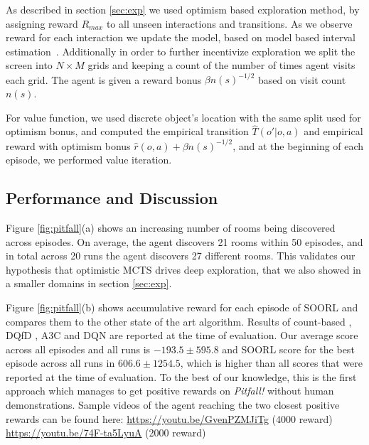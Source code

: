 As described in section \ref{sec:exp} we used optimism based exploration method, by assigning reward $R_{max}$ to all unseen interactions and transitions. As we observe reward for each interaction we update the model, based on model based interval estimation~\citep{strehl2008analysis}. Additionally in order to further incentivize exploration we split the screen into $N \times  M$ grids and keeping a count of the number of times agent visits each grid. The agent is given a reward bonus $\beta n(s)^{-1/2}$ based on visit count $n(s)$.

For value function, we used discrete object's location with the same split used for optimism bonus, and computed the empirical transition $\hat{T}(o'|o,a)$ and empirical reward with optimism bonus $\hat{r}(o,a) + \beta n(s)^{-1/2}$, and at the beginning of each episode, we performed value iteration.

\subsection{Performance and Discussion}



Figure \ref{fig:pitfall}(a) shows an increasing number of rooms being discovered across episodes. On average, the agent discovers 21 rooms within 50 episodes, and in total across 20 runs the agent discovers 27 different rooms. This validates our hypothesis that optimistic MCTS drives deep exploration, that we also showed in a smaller domains in section \ref{sec:exp}. 

 Figure \ref{fig:pitfall}(b) shows accumulative reward for each episode of SOORL and compares them to the other state of the art algorithm. Results of count-based \citep{bellemare2016unifying}, DQfD \citep{hester2017deep}, A3C \citep{mnih2016asynchronous} and DQN \citep{mnih2015human} are reported at the time of evaluation. Our average score across all episodes and all runs is $-193.5 \pm 595.8$ and SOORL score for the best episode across all runs in $606.6 \pm 1254.5$, which is higher than all scores that were reported at the time of evaluation. To the best of our knowledge, this is the first approach which manages to get positive rewards on \textit{Pitfall!} without human demonstrations.  Sample videos of the agent reaching the two closest positive rewards can be found here: \url{https://youtu.be/GvenPZMJiTg} (4000 reward)\,\,
\url{https://youtu.be/74F-ta5LyuA} (2000 reward)

